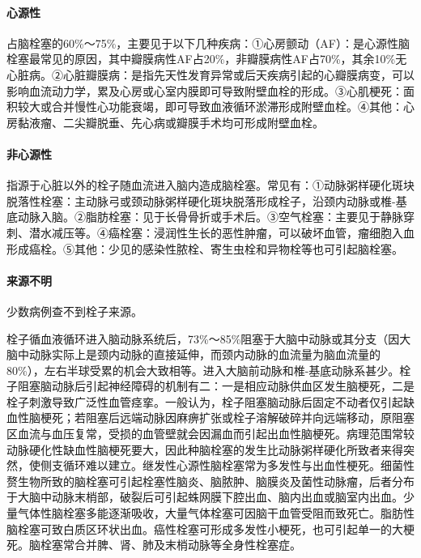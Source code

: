 \paragraph{心源性}

占脑栓塞的60\%～75\%，主要见于以下几种疾病：①心房颤动（AF）：是心源性脑栓塞最常见的原因，其中瓣膜病性AF占20\%，非瓣膜病性AF占70\%，其余10\%无心脏病。②心脏瓣膜病：是指先天性发育异常或后天疾病引起的心瓣膜病变，可以影响血流动力学，累及心房或心室内膜即可导致附壁血栓的形成。③心肌梗死：面积较大或合并慢性心功能衰竭，即可导致血液循环淤滞形成附壁血栓。④其他：心房黏液瘤、二尖瓣脱垂、先心病或瓣膜手术均可形成附壁血栓。

\paragraph{非心源性}

指源于心脏以外的栓子随血流进入脑内造成脑栓塞。常见有：①动脉粥样硬化斑块脱落性栓塞：主动脉弓或颈动脉粥样硬化斑块脱落形成栓子，沿颈内动脉或椎-基底动脉入脑。②脂肪栓塞：见于长骨骨折或手术后。③空气栓塞：主要见于静脉穿刺、潜水减压等。④癌栓塞：浸润性生长的恶性肿瘤，可以破坏血管，瘤细胞入血形成癌栓。⑤其他：少见的感染性脓栓、寄生虫栓和异物栓等也可引起脑栓塞。

\paragraph{来源不明}

少数病例查不到栓子来源。

栓子循血液循环进入脑动脉系统后，73\%～85\%阻塞于大脑中动脉或其分支（因大脑中动脉实际上是颈内动脉的直接延伸，而颈内动脉的血流量为脑血流量的80\%），左右半球受累的机会大致相等。进入大脑前动脉和椎-基底动脉系甚少。栓子阻塞脑动脉后引起神经障碍的机制有二：一是相应动脉供血区发生脑梗死，二是栓子刺激导致广泛性血管痉挛。一般认为，栓子阻塞脑动脉后固定不动者仅引起缺血性脑梗死；若阻塞后远端动脉因麻痹扩张或栓子溶解破碎并向远端移动，原阻塞区血流与血压复常，受损的血管壁就会因漏血而引起出血性脑梗死。病理范围常较动脉硬化性缺血性脑梗死要大，因此种脑栓塞的发生比动脉粥样硬化所致者来得突然，使侧支循环难以建立。继发性心源性脑栓塞常为多发性与出血性梗死。细菌性赘生物所致的脑栓塞可引起栓塞性脑炎、脑脓肿、脑膜炎及菌性动脉瘤，后者分布于大脑中动脉末梢部，破裂后可引起蛛网膜下腔出血、脑内出血或脑室内出血。少量气体性脑栓塞多能逐渐吸收，大量气体栓塞可因脑干血管受阻而致死亡。脂肪性脑栓塞可致白质区环状出血。癌性栓塞可形成多发性小梗死，也可引起单一的大梗死。脑栓塞常合并脾、肾、肺及末梢动脉等全身性栓塞症。

